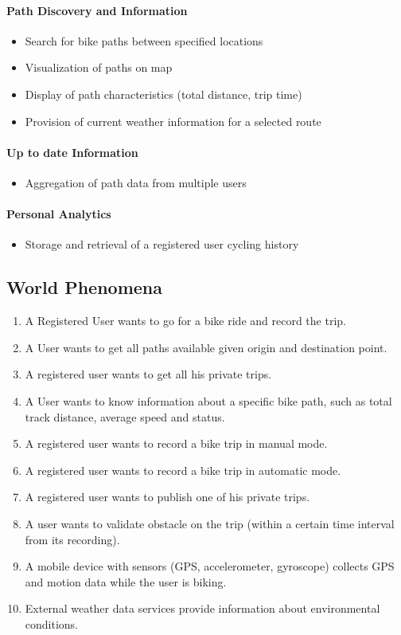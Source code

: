 \paragraph{Path Discovery and Information}
\begin{itemize}
    \item Search for bike paths between specified locations
    \item Visualization of paths on map
    \item Display of path characteristics (total distance, trip time)
    \item Provision of current weather information for a selected route
\end{itemize}

\paragraph{Up to date Information}
\begin{itemize}
    \item Aggregation of path data from multiple users
\end{itemize}

\paragraph{Personal Analytics}
\begin{itemize}
    \item Storage and retrieval of a registered user cycling history
\end{itemize}



\subsection{World Phenomena}

\begin{enumerate}
    \item A Registered User wants to go for a bike ride and record the trip.
    \item A User wants to get all paths available given origin and destination point.
    \item A registered user wants to get all his private trips.
    \item A User wants to know information about a specific bike path, such as total track distance, average speed and status.
    \item A registered user wants to record a bike trip in manual mode.
    \item A registered user wants to record a bike trip in automatic mode.
    \item A registered user wants to publish one of his private trips.
    \item A user wants to validate obstacle on the trip (within a certain time interval from its recording).
    \item A mobile device with sensors (GPS, accelerometer, gyroscope) collects GPS and motion data while the user is biking.
    \item External weather data services provide information about environmental conditions.
\end{enumerate}

